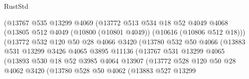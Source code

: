 \begin{lexlean}{RustStd}
\begin{coremodule}
                            (@13767
                              @535
                              @13299
                              @4069
                              (@13772
                                @513
                                @534
                                @18
                                @52
                                @4049
                                @4068
                                (@13805
                                  @512
                                  @4049
                                  (@10800 (@10801 @4049))
                                  (@10616 (@10806 @512 @18)))
                                (@13772
                                  @532
                                  @120
                                  @50
                                  @28
                                  @4066
                                  @3420
                                  (@13780
                                    @532
                                    @50
                                    @4066
                                    (@13883
                                      @531
                                      @13299
                                      @3426
                                      @4065
                                      @3895
                                      @11136
                                      (@13767
                                        @531
                                        @13299
                                        @4065
                                        (@13893
                                          @530
                                          @18
                                          @52
                                          @3985
                                          @4064
                                          @13907
                                          (@13772
                                            @528
                                            @120
                                            @50
                                            @28
                                            @4062
                                            @3420
                                            (@13780
                                              @528
                                              @50
                                              @4062
                                              (@13883
                                                @527
                                                @13299

\end{coremodule}
\end{lexlean}
